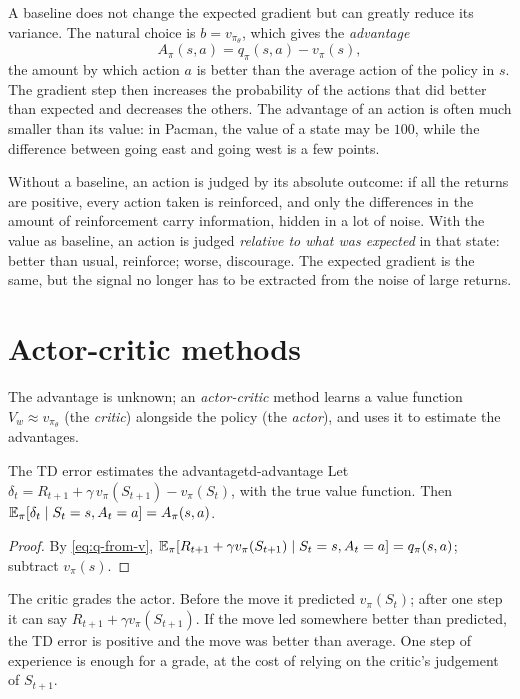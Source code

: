 A baseline does not change the expected gradient but can greatly reduce
its variance. The natural choice is $b = v_{\pi_\theta}$, which gives the
\emph{advantage}
\begin{equation}
  A_\pi(s, a) = q_\pi(s, a) - v_\pi(s),
\end{equation}
the amount by which action $a$ is better than the average action of the
policy in $s$. The gradient step then increases the probability of the
actions that did better than expected and decreases the others. The
advantage of an action is often much smaller than its value: in Pacman, the
value of a state may be $100$, while the difference between going east and
going west is a few points.

\begin{intuition}
  Without a baseline, an action is judged by its absolute outcome: if all
  the returns are positive, every action taken is reinforced, and only the
  differences in the amount of reinforcement carry information, hidden in
  a lot of noise. With the value as baseline, an action is judged
  \emph{relative to what was expected} in that state: better than usual,
  reinforce; worse, discourage. The expected gradient is the same, but the
  signal no longer has to be extracted from the noise of large returns.
\end{intuition}

\section{Actor-critic methods}

The advantage is unknown; an \emph{actor-critic} method learns a value
function $V_w \approx v_{\pi_\theta}$ (the \emph{critic}) alongside the
policy (the \emph{actor}), and uses it to estimate the advantages.

\begin{proposition}{The TD error estimates the advantage}{td-advantage}
  Let $\delta_t = R_{t+1} + \gamma\, v_\pi(S_{t+1}) - v_\pi(S_t)$, with the
  true value function. Then $\mathbb{E}_\pi[\delta_t \mid S_t = s, A_t = a] =
  A_\pi(s, a)$.
\end{proposition}

\begin{proof}
  By \eqref{eq:q-from-v}, $\mathbb{E}_\pi[R_{t+1} + \gamma v_\pi(S_{t+1}) \mid S_t
  = s, A_t = a] = q_\pi(s, a)$; subtract $v_\pi(s)$.
\end{proof}

\begin{intuition}
  The critic grades the actor. Before the move it predicted $v_\pi(S_t)$;
  after one step it can say $R_{t+1} + \gamma v_\pi(S_{t+1})$. If the move
  led somewhere better than predicted, the TD error is positive and the
  move was better than average. One step of experience is enough for a
  grade, at the cost of relying on the critic's judgement of $S_{t+1}$.
\end{intuition}

